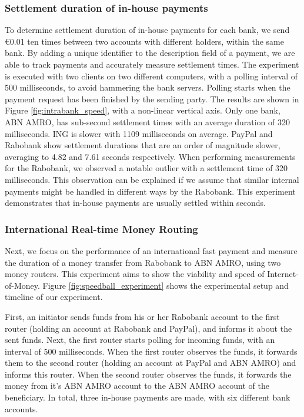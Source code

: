 \subsubsection*{Settlement duration of in-house payments}
\label{sec:settlement_inhouse_experiment}
To determine settlement duration of in-house payments for each bank, we send \euro 0.01 ten times between two accounts with different holders, within the same bank.
By adding a unique identifier to the description field of a payment, we are able to track payments and accurately measure settlement times.
The experiment is executed with two clients on two different computers, with a polling interval of 500 milliseconds, to avoid hammering the bank servers.
Polling starts when the payment request has been finished by the sending party.
The results are shown in Figure \ref{fig:intrabank_speed}, with a non-linear vertical axis.
Only one bank, ABN AMRO, has sub-second settlement times with an average duration of 320 milliseconds.
ING is slower with 1109 milliseconds on average.
PayPal and Rabobank show settlement durations that are an order of magnitude slower, averaging to 4.82 and 7.61 seconds respectively.
When performing measurements for the Rabobank, we observed a notable outlier with a settlement time of 320 milliseconds.
This observation can be explained if we assume that similar internal payments might be handled in different ways by the Rabobank.
This experiment demonstrates that in-house payments are usually settled within seconds.

\subsubsection*{International Real-time Money Routing}
Next, we focus on the performance of an international fast payment and measure the duration of a money transfer from Rabobank to ABN AMRO, using two money routers.
This experiment aims to show the viability and speed of Internet-of-Money.
Figure \ref{fig:speedball_experiment} shows the experimental setup and timeline of our experiment.

First, an initiator sends funds from his or her Rabobank account to the first router (holding an account at Rabobank and PayPal), and informs it about the sent funds.
Next, the first router starts polling for incoming funds, with an interval of 500 milliseconds.
When the first router observes the funds, it forwards them to the second router (holding an account at PayPal and ABN AMRO) and informs this router.
When the second router observes the funds, it forwards the money from it's ABN AMRO account to the ABN AMRO account of the beneficiary.
In total, three in-house payments are made, with six different bank accounts.

